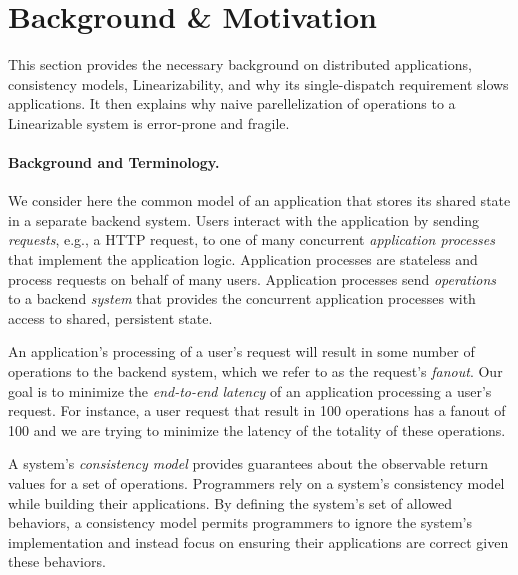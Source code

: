 \section{Background \& Motivation}
This section provides the necessary background on distributed applications, consistency models, Linearizability, and why its single-dispatch requirement slows applications.
It then explains why naive parellelization of operations to a Linearizable system is error-prone and fragile.

\paragraph{Background and Terminology.}
We consider here the common model of an application that stores its shared state in a separate backend system.
Users interact with the application by sending \textit{requests}, e.g., a HTTP request, to one of many concurrent \textit{application processes} that implement the application logic. Application processes are stateless and process requests on behalf of many users. Application processes send \textit{operations} to a backend \textit{system} that provides the concurrent application processes with access to shared, persistent state.

An application's processing of a user's request will result in some number of operations to the backend system, which we refer to as the request's \textit{fanout}. Our goal is to minimize the \textit{end-to-end latency} of an application processing a user's request. For instance, a user request that result in 100 operations has a fanout of 100 and we are trying to minimize the latency of the totality of these operations.

A system's \textit{consistency model} provides guarantees about the observable return values for a set of operations.
Programmers rely on a system's consistency model while building their applications. By defining the system's set of allowed behaviors, a consistency model permits programmers to ignore the system's implementation and instead focus on ensuring their applications are correct given these behaviors.

